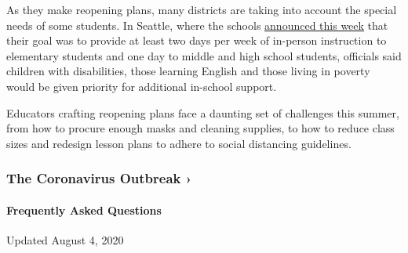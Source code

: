 As they make reopening plans, many districts are taking into account the
special needs of some students. In Seattle, where the schools
\href{https://www.seattleschools.org/district/calendars/news/what_s_new/coronavirus_update}{announced
this week} that their goal was to provide at least two days per week of
in-person instruction to elementary students and one day to middle and
high school students, officials said children with disabilities, those
learning English and those living in poverty would be given priority for
additional in-school support.

Educators crafting reopening plans face a daunting set of challenges
this summer, from how to procure enough masks and cleaning supplies, to
how to reduce class sizes and redesign lesson plans to adhere to social
distancing guidelines.

\href{https://www.nytimes3xbfgragh.onion/news-event/coronavirus?action=click\&pgtype=Article\&state=default\&region=MAIN_CONTENT_3\&context=storylines_faq}{}

\hypertarget{the-coronavirus-outbreak-}{%
\subsubsection{The Coronavirus Outbreak
›}\label{the-coronavirus-outbreak-}}

\hypertarget{frequently-asked-questions}{%
\paragraph{Frequently Asked
Questions}\label{frequently-asked-questions}}

Updated August 4, 2020

